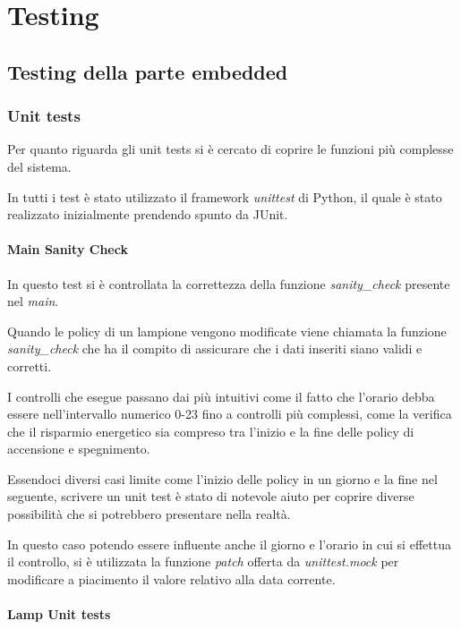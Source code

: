 \chapter{Testing}


\section{Testing della parte embedded}

\subsection{Unit tests}

Per quanto riguarda gli unit tests si è cercato di coprire le funzioni più complesse del sistema.

In tutti i test è stato utilizzato il framework \textit{unittest} di Python, il quale è stato realizzato inizialmente prendendo spunto da JUnit.

\subsubsection{Main Sanity Check \label{msc}}

In questo test si è controllata la correttezza della funzione \textit{sanity\_check} presente nel \textit{main}.

Quando le policy di un lampione vengono modificate viene chiamata la funzione \textit{sanity\_check} che ha il compito di assicurare che i dati inseriti siano validi e corretti.

I controlli che esegue passano dai più intuitivi come il fatto che l'orario debba essere nell'intervallo numerico 0-23 fino a controlli più complessi, come la verifica che il risparmio energetico sia compreso tra l'inizio e la fine delle policy di accensione e spegnimento.

Essendoci diversi casi limite come l'inizio delle policy in un giorno e la fine nel seguente, scrivere un unit test è stato di notevole aiuto per coprire diverse possibilità che si potrebbero presentare nella realtà.

In questo caso potendo essere influente anche il giorno e l'orario in cui si effettua il controllo, si è utilizzata la funzione \textit{patch} offerta da \textit{unittest.mock} per modificare a piacimento il valore relativo alla data corrente.


\subsubsection{Lamp Unit tests}

